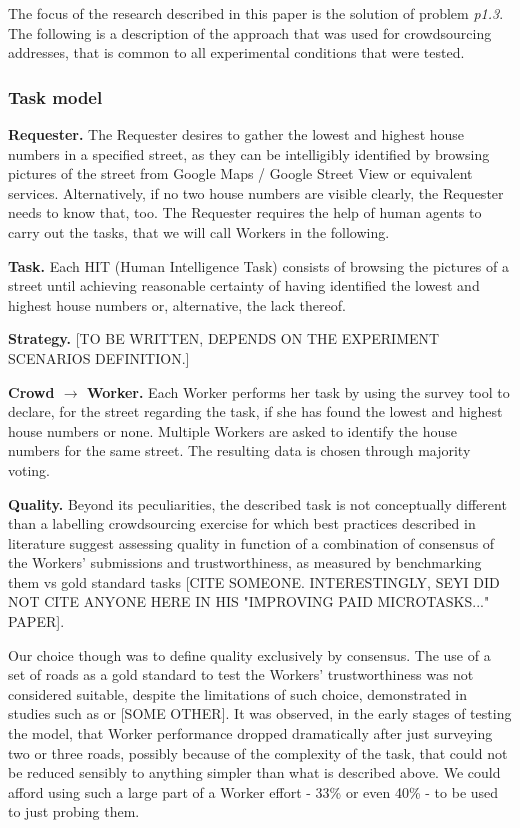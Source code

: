    The focus of the research described in this paper is the solution of problem {\it p1.3}. The following is a description of the approach that was used for crowdsourcing addresses, that is common to all experimental conditions that were tested.

    \subsubsection{Task model}

        \textbf{Requester.} The Requester desires to gather the lowest and highest house numbers in a specified street, as they can be intelligibly identified by browsing pictures of the street from Google Maps / Google Street View or equivalent services. Alternatively, if no two house numbers are visible clearly, the Requester needs to know that, too. The Requester requires the help of human agents to carry out the tasks, that we will call Workers in the following.
        
        \textbf{Task.} Each HIT (Human Intelligence Task) consists of browsing the pictures of a street until achieving reasonable certainty of having identified the lowest and highest house numbers or, alternative, the lack thereof.
        
        \textbf{Strategy.} 
        {[}TO BE WRITTEN, DEPENDS ON THE EXPERIMENT SCENARIOS DEFINITION.{]}
        
        \textbf{Crowd $\rightarrow$ Worker.} Each Worker performs her task by using the survey tool to declare, for the street regarding the task, if she has found the lowest and highest house numbers or none. Multiple Workers are asked to identify the house numbers for the same street. The resulting data is chosen through majority voting.
    
        \textbf{Quality.} Beyond its peculiarities, the described task is not conceptually different than a labelling crowdsourcing exercise for which best practices described in literature suggest assessing quality in function of a combination of consensus of the Workers' submissions and trustworthiness, as measured by benchmarking them vs gold standard tasks [CITE SOMEONE. INTERESTINGLY, SEYI DID NOT CITE ANYONE HERE IN HIS "IMPROVING PAID MICROTASKS..." PAPER].
        
        Our choice though was to define quality exclusively by consensus. The use of a set of roads as a gold standard to test the Workers' trustworthiness was not considered suitable, despite the limitations of such choice, demonstrated in studies such as \cite{DellaPenna:tf} or [SOME OTHER]. It was observed, in the early stages of testing the model, that Worker performance dropped dramatically after just surveying two or three roads, possibly because of the complexity of the task, that could not be reduced sensibly to anything simpler than what is described above. We could afford using such a large part of a Worker effort - 33\% or even 40\% - to be used to just probing them.
        
